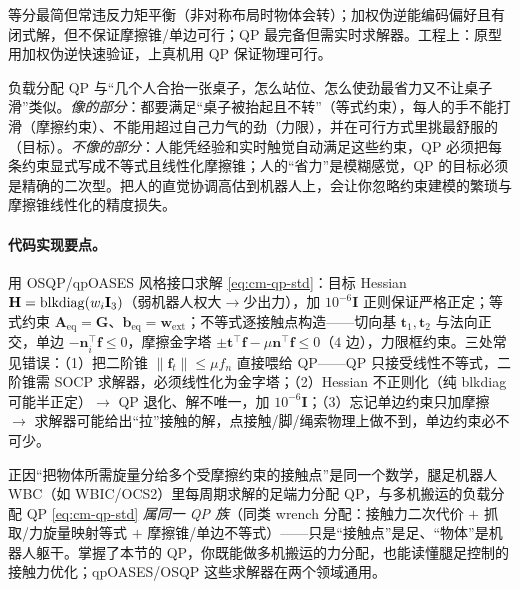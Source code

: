 \noindent 等分最简但常违反力矩平衡（非对称布局时物体会转）；加权伪逆能编码偏好且有闭式解，但不保证摩擦锥/单边可行；QP 最完备但需实时求解器。工程上：原型用加权伪逆快速验证，上真机用 QP 保证物理可行。

\begin{note}
负载分配 QP 与“几个人合抬一张桌子，怎么站位、怎么使劲最省力又不让桌子滑”类似。\emph{像的部分}：都要满足“桌子被抬起且不转”（等式约束），每人的手不能打滑（摩擦约束）、不能用超过自己力气的劲（力限），并在可行方式里挑最舒服的（目标）。\emph{不像的部分}：人能凭经验和实时触觉自动满足这些约束，QP 必须把每条约束显式写成不等式且线性化摩擦锥；人的“省力”是模糊感觉，QP 的目标必须是精确的二次型。把人的直觉协调高估到机器人上，会让你忽略约束建模的繁琐与摩擦锥线性化的精度损失。
\end{note}

\paragraph{代码实现要点。}
用 OSQP/qpOASES 风格接口求解 \cref{eq:cm-qp-std}：目标 Hessian $\mathbf{H}=\operatorname{blkdiag}(w_i\mathbf{I}_3)$（弱机器人权大$\to$少出力），加 $10^{-6}\mathbf{I}$ 正则保证严格正定；等式约束 $\mathbf{A}_{\text{eq}}=\mathbf{G}$、$\mathbf{b}_{\text{eq}}=\mathbf{w}_{\text{ext}}$；不等式逐接触点构造——切向基 $\mathbf{t}_1,\mathbf{t}_2$ 与法向正交，单边 $-\mathbf{n}_i^\top\mathbf{f}\le 0$，摩擦金字塔 $\pm\mathbf{t}^\top\mathbf{f}-\mu\mathbf{n}^\top\mathbf{f}\le 0$（$4$ 边），力限框约束。三处常见错误：（1）把二阶锥 $\|\mathbf{f}_t\|\le\mu f_n$ 直接喂给 QP——QP 只接受线性不等式，二阶锥需 SOCP 求解器，必须线性化为金字塔；（2）Hessian 不正则化（纯 blkdiag 可能半正定）$\to$ QP 退化、解不唯一，加 $10^{-6}\mathbf{I}$；（3）忘记单边约束只加摩擦 $\to$ 求解器可能给出“拉”接触的解，点接触/脚/绳索物理上做不到，单边约束必不可少。

\begin{insight}
正因“把物体所需旋量分给多个受摩擦约束的接触点”是同一个数学，腿足机器人 WBC（如 WBIC/OCS2）里每周期求解的足端力分配 QP，与多机搬运的负载分配 QP \cref{eq:cm-qp-std} \emph{属同一 QP 族}（同类 wrench 分配：接触力二次代价 $+$ 抓取/力旋量映射等式 $+$ 摩擦锥/单边不等式）——只是“接触点”是足、“物体”是机器人躯干。掌握了本节的 QP，你既能做多机搬运的力分配，也能读懂腿足控制的接触力优化；qpOASES/OSQP 这些求解器在两个领域通用。
\end{insight}

